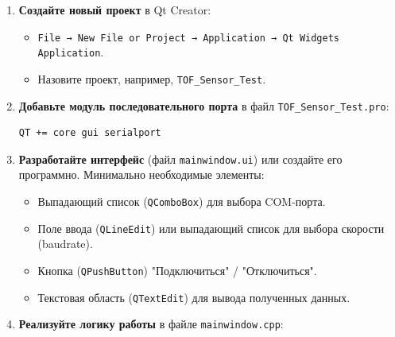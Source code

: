 \documentclass[12pt,a4paper]{article}
\begin{document}
\begin{enumerate}
    \item \textbf{Создайте новый проект} в Qt Creator: 
    \begin{itemize}
        \item \texttt{File → New File or Project → Application → Qt Widgets Application}.
        \item Назовите проект, например, \texttt{TOF\_Sensor\_Test}.
    \end{itemize}
    
    \item \textbf{Добавьте модуль последовательного порта} в файл \texttt{TOF\_Sensor\_Test.pro}:
    \begin{lstlisting}[style=myCStyle]
QT += core gui serialport
    \end{lstlisting}
    
    \item \textbf{Разработайте интерфейс} (файл \texttt{mainwindow.ui}) или создайте его программно. Минимально необходимые элементы:
    \begin{itemize}
        \item Выпадающий список (\texttt{QComboBox}) для выбора COM-порта.
        \item Поле ввода (\texttt{QLineEdit}) или выпадающий список для выбора скорости (baudrate).
        \item Кнопка (\texttt{QPushButton}) "Подключиться" / "Отключиться".
        \item Текстовая область (\texttt{QTextEdit}) для вывода полученных данных.
    \end{itemize}
    
    \item \textbf{Реализуйте логику работы} в файле \texttt{mainwindow.cpp}:
\end{enumerate}
\end{document}
